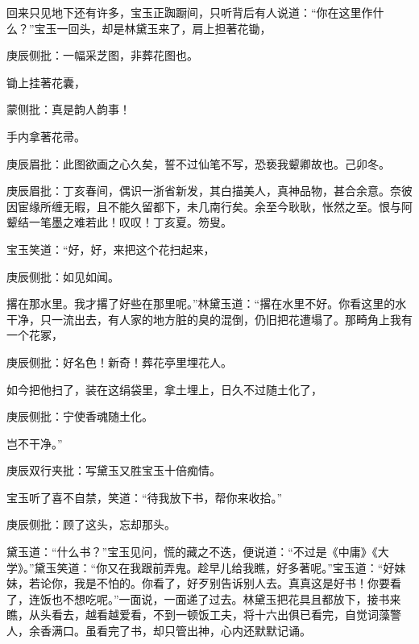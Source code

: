 \begin{parag}
    回来只见地下还有许多，宝玉正踟蹰间，只听背后有人说道：“你在这里作什么？”宝玉一回头，却是林黛玉来了，肩上担著花锄，\begin{note}庚辰侧批：一幅采芝图，非葬花图也。\end{note}锄上挂著花囊，\begin{note}蒙侧批：真是韵人韵事！\end{note}手内拿著花帚。\begin{note}庚辰眉批：此图欲画之心久矣，誓不过仙笔不写，恐亵我颦卿故也。己卯冬。\end{note}\begin{note}庚辰眉批：丁亥春间，偶识一浙省新发，其白描美人，真神品物，甚合余意。奈彼因宦缘所缠无暇，且不能久留都下，未几南行矣。余至今耿耿，怅然之至。恨与阿颦结一笔墨之难若此！叹叹！丁亥夏。笏叟。\end{note}宝玉笑道：“好，好，来把这个花扫起来，\begin{note}庚辰侧批：如见如闻。\end{note}撂在那水里。我才撂了好些在那里呢。”林黛玉道：“撂在水里不好。你看这里的水干净，只一流出去，有人家的地方脏的臭的混倒，仍旧把花遭塌了。那畸角上我有一个花冢，\begin{note}庚辰侧批：好名色！新奇！葬花亭里埋花人。\end{note}如今把他扫了，装在这绢袋里，拿土埋上，日久不过随土化了，\begin{note}庚辰侧批：宁使香魂随土化。\end{note}岂不干净。”\begin{note}庚辰双行夹批：写黛玉又胜宝玉十倍痴情。\end{note}宝玉听了喜不自禁，笑道：“待我放下书，帮你来收拾。”\begin{note}庚辰侧批：顾了这头，忘却那头。\end{note}黛玉道：“什么书？”宝玉见问，慌的藏之不迭，便说道：“不过是《中庸》《大学》。”黛玉笑道：“你又在我跟前弄鬼。趁早儿给我瞧，好多著呢。”宝玉道：“好妹妹，若论你，我是不怕的。你看了，好歹别告诉别人去。真真这是好书！你要看了，连饭也不想吃呢。”一面说，一面递了过去。林黛玉把花具且都放下，接书来瞧，从头看去，越看越爱看，不到一顿饭工夫，将十六出俱已看完，自觉词藻警人，余香满口。虽看完了书，却只管出神，心内还默默记诵。
\end{parag}


